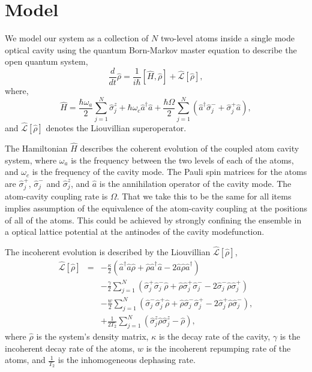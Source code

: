 \documentclass[aps,
twocolumn,
superscriptaddress,groupedaddress]{revtex4}
\begin{document}
\section{Model}
\label{sec:Model}

We model our system as a collection of $N$ two-level atoms inside a
single mode optical cavity using the quantum Born-Markov master equation
to describe the open quantum system,
\begin{equation}
  \frac{d}{dt} \hat{\rho} =
  \frac{1}{i \hbar} \left[ \hat{H}, \hat{\rho} \right] +
  \hat{\mathcal{L}}\left[ \hat{\rho} \right],
\label{ME1Crossover}
\end{equation}
where,
\begin{equation}
\hat{H} = \frac{\hbar \omega_a}{2} \sum_{j=1}^{N} \hat{\sigma}^{z}_{j}
+ \hbar \omega_c \hat{a}^{\dagger}\hat{a}
+ \frac{\hbar \Omega}{2}  \sum_{j=1}^{N} \left(
    \hat{a}^{\dagger} \hat{\sigma}^{-}_{j} +
    \hat{\sigma}^{+}_{j} \hat{a} \right),
\end{equation}
and $\hat{\mathcal{L}}\left[ \hat{\rho} \right]$ denotes the
Liouvillian superoperator.

The Hamiltonian $\hat{H}$ describes the coherent evolution of the
coupled atom cavity system, where $\omega_{a}$ is the frequency
between the two levels of each of the atoms, and $\omega_c$ is the
frequency of the cavity mode. The Pauli spin matrices for the atoms
are $\hat{\sigma}_j^{+}$, $\hat{\sigma}_j^{-}$ and
$\hat{\sigma}_j^{z}$, and $\hat{a}$ is the annihilation operator of
the cavity mode. The atom-cavity coupling rate is $\Omega$. That we
take this to be the same for all items implies assumption of the
equivalence of the atom-cavity coupling at the positions of all of the
atoms. This could be achieved by strongly confining the ensemble in a
optical lattice potential at the antinodes of the cavity modefunction.

The incoherent evolution is described by the Liouvillian
$\hat{\mathcal{L}}\left[ \hat{\rho} \right]$,
\begin{eqnarray}
\hat{\mathcal{L}}\left[ \hat{\rho} \right] &=&
  -\frac{\kappa}{2}
  \left(
    \hat{a}^{\dagger} \hat{a} \hat{\rho}
    + \hat{\rho}  \hat{a}^{\dagger} \hat{a}
    - 2\hat{a} \hat{\rho} \hat{a}^{\dagger}
  \right)
\nonumber
\\
 &&-\frac{\gamma}{2} \sum_{j=1}^N
  \left(
   \hat{\sigma}_{j}^{+} \hat{\sigma}_{j}^{-} \hat{\rho}
   + \hat{\rho} \hat{\sigma}_{j}^{+} \hat{\sigma}_{j}^{-}
   - 2\hat{\sigma}_{j}^{-} \hat{\rho} \hat{\sigma}_{j}^{+}
  \right)
\nonumber
\\
 &&-\frac{w}{2} \sum_{j=1}^N
  \left(
   \hat{\sigma}_{j}^{-} \hat{\sigma}_{j}^{+} \hat{\rho}
   + \hat{\rho} \hat{\sigma}_{j}^{-} \hat{\sigma}_{j}^{+}
   - 2\hat{\sigma}_{j}^{+} \hat{\rho}  \hat{\sigma}_{j}^{-}
  \right),
\nonumber
\\
 &&+\frac{1}{2T_2} \sum_{j=1}^N
  \left(
   \hat{\sigma}_{j}^{z} \hat{\rho}  \hat{\sigma}_{j}^{z} - \hat{\rho}
  \right),
\end{eqnarray}
where $\hat{\rho}$ is the system's density matrix, $\kappa$ is the decay
rate of the cavity, $\gamma$ is the incoherent decay rate of the atoms,
$w$ is the incoherent repumping rate of the atoms, and $\frac{1}{T_2}$
is the inhomogeneous dephasing rate.
\end{document}
